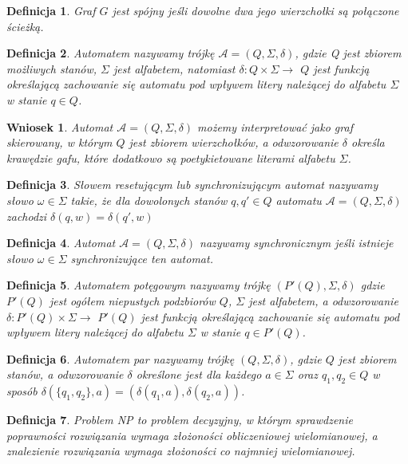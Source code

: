 \documentclass[12pt,a4paper]{article}
\newtheorem{df}{Definicja}[section]
\newtheorem{wn}{Wniosek}[section]
\begin{document}
\begin{df} 
Graf $G$ jest sp\'ojny je\'sli dowolne dwa jego wierzcho{\l}ki s\k{a} po{\l}\k{a}czone \'scie\.zk\k{a}.
\end{df}
\begin{df} 
Automatem nazywamy tr\'{o}jk\k{e} $\mathscr{A}=(Q, \Sigma, \delta)$, gdzie Q jest zbiorem mo\.{z}liwych stan\'{o}w, $\Sigma$ jest alfabetem, natomiast $\delta:Q \times \Sigma \rightarrow$ $Q$ jest funkcj\k{a} okre\'{s}laj\k{a}c\k{a} zachowanie si\k{e} automatu pod wp{\l}ywem litery nale\.{z}\k{a}cej do alfabetu $\Sigma$ w stanie $q \in Q$.
\end{df}
\begin{wn}
Automat $\mathscr{A}=(Q, \Sigma, \delta)$ mo\.zemy interpretowa\'c jako graf skierowany, w kt\'orym $Q$ jest zbiorem wierzcho{\l}k\'ow, a odwzorowanie $\delta$ okre\'sla kraw\k{e}dzie gafu, kt\'ore dodatkowo s\k{a} poetykietowane literami alfabetu $\Sigma$.
\end{wn}
\begin{df} 
S{\l}owem resetuj\k{a}cym lub synchronizuj\k{a}cym automat nazywamy s{\l}owo $\omega \in \Sigma$ takie, \.{z}e dla dowolonych stan\'{o}w $q, q' \in Q$ automatu $\mathscr{A}=(Q, \Sigma, \delta)$ zachodzi $\delta(q,w)=\delta(q',w)$
\end{df}
\begin{df} 
Automat $\mathscr{A}=(Q, \Sigma, \delta)$ nazywamy synchronicznym je\'{s}li istnieje s{\l}owo $\omega \in \Sigma$ synchronizuj\k{a}ce ten automat.
\end{df}
\begin{df}
Automatem pot\k{e}gowym nazywamy tr\'{o}jk\k{e} $(P'(Q), \Sigma, \delta)$ gdzie 
$P'(Q)$ jest og\'{o}{\l}em niepustych podzbior\'{o}w $Q$, $\Sigma$ jest alfabetem, a odwzorowanie $\delta:P'(Q) \times \Sigma \rightarrow$ $P'(Q)$ jest funkcj\k{a} okre\'{s}laj\k{a}c\k{a} zachowanie si\k{e} automatu pod wp{\l}ywem litery nale\.{z}\k{a}cej do alfabetu $\Sigma$ w stanie $q \in P'(Q)$.
\end{df}
\begin{df}
Automatem par nazywamy tr\'{o}jk\k{e} $(Q, \Sigma, \delta)$, gdzie $Q$ jest zbiorem stan\'{o}w, a odwzorowanie $\delta$ okre\'{s}lone jest dla ka\.{z}dego $a \in \Sigma$ oraz $q_1, q_2 \in Q$ w spos\'{o}b $\delta(\{q_1,q_2\}, a) = (\delta(q_1,a), \delta(q_2,a))$.
\end{df}
\begin{df}
Problem NP to problem decyzyjny, w kt\'orym sprawdzenie poprawno\'sci rozwi\k{a}zania wymaga z{\l}o\.zono\'sci obliczeniowej wielomianowej, a znalezienie rozwi\k{a}zania wymaga z{\l}o\.zono\'sci co najmniej wielomianowej.
\end{df}
\end{document}
